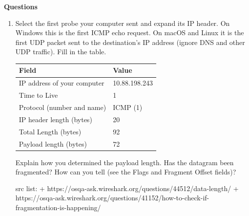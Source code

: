 \documentclass[11pt]{article}
\newcommand{\screenshot}[2]{\par\medskip\noindent\fbox{\parbox[c][#1][c]{\dimexpr\linewidth-2\fboxsep-2\fboxrule\relax}{\centering\small\color{gray}Screenshot: #2}}\par\medskip}
\newcommand{\answer}[1]{\par\smallskip\noindent\fbox{\parbox{\dimexpr\linewidth-2\fboxsep-2\fboxrule\relax}{#1\vspace{1.2em}}}\par\smallskip}
\newenvironment{questions}[1]{\par\medskip\noindent\textbf{Questions}\begin{enumerate}[leftmargin=*,label=\textbf{Q#1.\arabic*},itemsep=8pt]}{\end{enumerate}}
\begin{document}
\begin{questions}{2}
  NOTE: I changed WiFi connections between last question and this, so my IP is now registering as 10.88.198.243 and ping is now showing Oxford at 104.20.34.13.

  \item Select the first probe your computer sent and expand its IP header. On Windows this is the first ICMP echo request. On macOS and Linux it is the first UDP packet sent to the destination's IP address (ignore DNS and other UDP traffic). Fill in the table.
  \begin{center}
  \renewcommand{\arraystretch}{1.7}
  \begin{tabular}{@{}p{5.2cm}p{7cm}@{}}
  \toprule
  \textbf{Field} & \textbf{Value} \\
  \midrule
  IP address of your computer & 10.88.198.243 \\
  Time to Live & 1 \\
  Protocol (number and name) & ICMP (1) \\
  IP header length (bytes) & 20 \\
  Total Length (bytes) & 92 \\ %
  Payload length (bytes) & 72 \\ %
  \bottomrule
  \end{tabular}
  \end{center}
  Explain how you determined the payload length. Has the datagram been fragmented? How can you tell (see the Flags and Fragment Offset fields)?
  \answer{[The payload length is anything that is not in the header, so if the total IP size is 92 bytes, and the header is 20 bytes: payload = 92 - 20 = 72 bytes. The datagram has not been fragmented because the fragment bit is not set and the fragment offset is not greater than 0.]}
  src list: 
  + https://osqa-ask.wireshark.org/questions/44512/data-length/
  + https://osqa-ask.wireshark.org/questions/41152/how-to-check-if-fragmentation-is-happening/
  \screenshot{4cm}{Q2_ip.png}


\end{questions}
\end{document}
